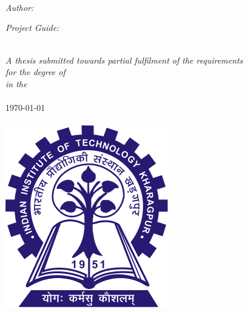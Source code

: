 \documentclass[11pt, a4paper, oneside]{Thesis}
\begin{document}
\begin{titlepage}
\begin{center}

\HRule \\[0.4cm] %
{\huge \textsc{\ttitle}}\\[0.4cm] %
\HRule \\[1.5cm] %
 
\begin{minipage}{0.4\textwidth}
\begin{flushleft} \large
\emph{Author:}\\
\authornames
\end{flushleft}
\end{minipage}
\begin{minipage}{0.4\textwidth}
\begin{flushright} \large
\emph{Project Guide:} \\
\supname
\end{flushright}
\end{minipage}\\[3cm]
 
\large \textit{A thesis submitted towards partial fulfilment of the requirements\\ for the degree of \degreename}\\[0.3cm]
\textit{in the}\\[0.4cm]
\deptname\\[2cm]

{\large \today}\\[2cm]

\textsc{\LARGE \univname}\\[1.5cm]
\includegraphics[scale=0.5]{Logo.png}

\vfill
\end{center}

\end{titlepage}
\end{document}
